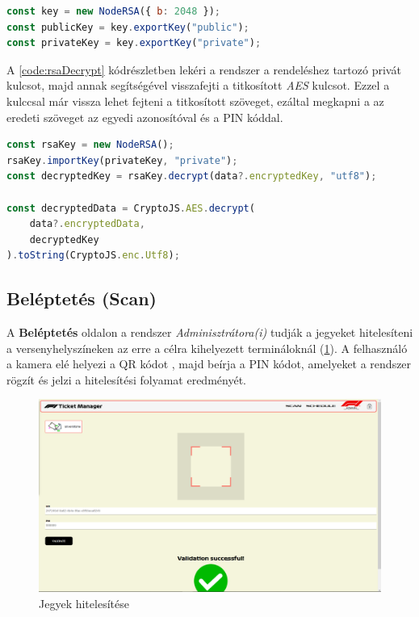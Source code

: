 \begin{lstlisting}[caption={RSA kulcsok generálása.}, captionpos=b, language = JavaScript, label={code:rsaGenrerate}]
const key = new NodeRSA({ b: 2048 });
const publicKey = key.exportKey("public");
const privateKey = key.exportKey("private");
\end{lstlisting}

A \ref{code:rsaDecrypt} kódrészletben lekéri a rendszer a rendeléshez tartozó privát kulcsot, majd annak segítségével visszafejti a titkosított \textit{AES} kulcsot. Ezzel a kulccsal már vissza lehet fejteni a titkosított szöveget, ezáltal megkapni a az eredeti szöveget az egyedi azonosítóval és a PIN kóddal.

\begin{lstlisting}[caption={RSA visszafejtés.}, captionpos=b, language = JavaScript, label={code:rsaDecrypt}]
const rsaKey = new NodeRSA();
rsaKey.importKey(privateKey, "private");
const decryptedKey = rsaKey.decrypt(data?.encryptedKey, "utf8");

const decryptedData = CryptoJS.AES.decrypt(
	data?.encryptedData,
	decryptedKey
).toString(CryptoJS.enc.Utf8);
\end{lstlisting}

\pagebreak
\subsection {Beléptetés (Scan)}

A \textbf{Beléptetés} oldalon a rendszer \textit{Adminisztrátora(i)} tudják a jegyeket hitelesíteni a versenyhelyszíneken az erre a célra kihelyezett termináloknál (\ref{abra:scan}). A felhasználó a kamera elé helyezi a QR kódot \cite{RQR}, majd beírja a PIN kódot, amelyeket a rendszer rögzít és jelzi a hitelesítési folyamat eredményét.

\begin{figure}[!h]
	\centering
	\includegraphics[scale=0.2]{images/scan}
	\caption{Jegyek hitelesítése}
	\label{abra:scan}
\end{figure}